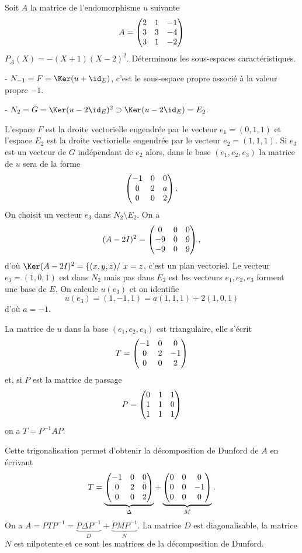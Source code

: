 \documentclass[class=report,crop=false]{standalone}
\begin{document}
\begin{exemple}
Soit $A$ la matrice de l'endomorphisme $u$ suivante
$$A=\left(\begin{matrix}2&1&-1\cr 3&3&-4\cr 3&1&-2\end{matrix}\right)$$
$P_A(X)=-(X+1)(X-2)^2$. Déterminons les sous-espaces caractéristiques.

- $N_{-1}=F=\Ker(u+\id_E)$, c'est le sous-espace propre associé à la valeur propre $-1$.

- $N_2=G=\Ker(u-2\id_E)^2\supset\Ker(u-2\id_E)=E_2$.

L'espace $F$ est la droite vectorielle engendrée par le vecteur $e_1=(0,1,1)$ et l'espace $E_2$ est la droite vectiorielle engendrée par le vecteur $e_2=(1,1,1)$. Si $e_3$ est un vecteur de $G$ indépendant de $e_2$ alors, dans le base $(e_1,e_2,e_3)$ la matrice de $u$ sera de la forme
$$\left(\begin{matrix}-1&0&0\cr 0&2&a\cr 0&0&2\end{matrix}\right).$$
On choisit un vecteur $e_3$ dans $N_2\setminus E_2$. On a 
$$(A-2I)^2=\left(\begin{matrix}0&0&0\cr -9&0&9\cr -9&0&9\end{matrix}\right),$$
d'où $\Ker(A-2I)^2=\{(x,y,z)/\ x=z$, c'est un plan vectoriel. Le vecteur $e_3=(1,0,1)$ est dans $N_2$ mais pas dans $E_2$ est les vecteurs $e_1,e_2,e_3$ forment une base de $E$. On calcule $u(e_3)$ et on identifie
$$u(e_3)=(1,-1,1)=a(1,1,1)+2(1,0,1)$$
d'où $a=-1$.

La matrice de $u$ dans la base $(e_1,e_2,e_3)$ est triangulaire, elle s'écrit  
$$T=\left(\begin{matrix}-1&0&0\cr 0&2&-1\cr 0&0&2\end{matrix}\right)$$
et, si $P$ est la matrice de passage
$$P=\left(\begin{matrix}0&1&1\cr 1&1&0\cr1&1&1\end{matrix}\right)$$
on a $T=P^{-1}AP$.

Cette trigonalisation permet d'obtenir la décomposition de Dunford de $A$ en écrivant
$$T=\underbrace{\left(\begin{matrix}-1&0&0\cr 0&2&0\cr 0&0&2\end{matrix}\right)}_\Delta+\underbrace{\left(\begin{matrix}0&0&0\cr 0&0&-1\cr 0&0&0\end{matrix}\right)}_M.$$
On a $A=PTP^{-1}=\underbrace{P\Delta P^{-1}}_D+\underbrace{PMP^{-1}}_N$. La matrice $D$ est diagonalisable, la matrice $N$ est nilpotente et ce sont 
les matrices de la décomposition de Dunford.
\end{exemple}
\end{document}
